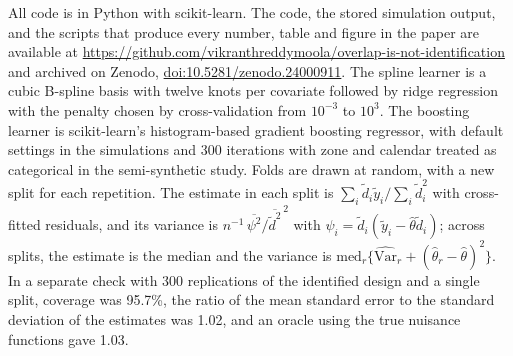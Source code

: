 \documentclass[11pt]{article}
\theoremstyle{remark}
\newcommand{\Var}{\mathrm{Var}}
\begin{document}
All code is in Python with scikit-learn. The code, the stored simulation output, and the scripts that produce every number, table and figure in the paper are available at \url{https://github.com/vikranthreddymoola/overlap-is-not-identification} and archived on Zenodo, \href{https://doi.org/10.5281/zenodo.24000911}{doi:10.5281/zenodo.24000911}. The spline learner is a cubic B-spline basis with twelve knots per covariate followed by ridge regression with the penalty chosen by cross-validation from $10^{-3}$ to $10^{3}$. The boosting learner is scikit-learn's histogram-based gradient boosting regressor, with default settings in the simulations and 300 iterations with zone and calendar treated as categorical in the semi-synthetic study. Folds are drawn at random, with a new split for each repetition. The estimate in each split is $\sum_i \tilde d_i \tilde y_i / \sum_i \tilde d_i^2$ with cross-fitted residuals, and its variance is $n^{-1}\,\overline{\psi^2} / \overline{\tilde d^2}^{\,2}$ with $\psi_i = \tilde d_i(\tilde y_i - \hat\theta \tilde d_i)$; across splits, the estimate is the median and the variance is $\mathrm{med}_r\{\widehat{\Var}_r + (\hat\theta_r - \hat\theta)^2\}$. In a separate check with 300 replications of the identified design and a single split, coverage was 95.7\%, the ratio of the mean standard error to the standard deviation of the estimates was 1.02, and an oracle using the true nuisance functions gave 1.03.
\end{document}
